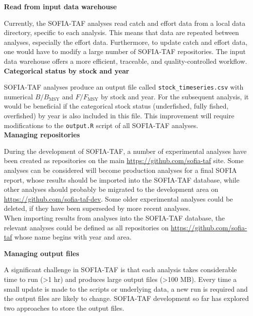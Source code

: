 \documentclass[12pt]{article}
\newcommand\blue[1]{\textcolor{darkblue}{#1}}
\newcommand\gt{\raisebox{0.1ex}\textgreater}
\begin{document}
\textbf{Read from input data warehouse}

Currently, the SOFIA-TAF analyses read catch and effort data from a local data
directory, specific to each analysis. This means that data are repeated between
analyses, especially the effort data. Furthermore, to update catch and effort
data, one would have to modify a large number of SOFIA-TAF repositories. The
input data warehouse offers a more efficient, traceable, and quality-controlled
workflow.\\[-2ex]

\textbf{Categorical status by stock and year}

SOFIA-TAF analyses produce an output file called \verb|stock_timeseries.csv|
with numerical $B/B_\mathrm{MSY}$ and $F/F_\mathrm{MSY}$ by stock and year. For
the subsequent analysis, it would be beneficial if the categorical stock status
(underfished, fully fished, overfished) by year is also included in this file.
This improvement will require
modifications to the \verb|output.R| script of all SOFIA-TAF analyses.\\[-2ex]

\textbf{Managing repositories}

During the development of SOFIA-TAF, a number of experimental analyses have been
created as repositories on the main \blue{\url{https://github.com/sofia-taf}}
site. Some analyses can be considered will become production analyses for a
final SOFIA report, whose results should be imported into the SOFIA-TAF
database, while other analyses should probably be migrated to the development
area on \mbox{\blue{\url{https://github.com/sofia-taf-dev}}}. Some older
experimental analyses could be deleted, if they have been superseded by more
recent analyses.\\[-2ex]

When importing results from analyses into the SOFIA-TAF database, the relevant
analyses could be defined as all repositories on
\blue{\url{https://github.com/sofia-taf}} whose name begins with year and area.

\newpage

\textbf{Managing output files}

A significant challenge in SOFIA-TAF is that each analysis takes considerable
time to run (\gt 1 hr) and produces large output files (\gt 100 MB). Every time
a small update is made to the scripts or underlying data, a new run is required
and the output files are likely to change. SOFIA-TAF development so far has
explored two approaches to store the output files.
\end{document}
